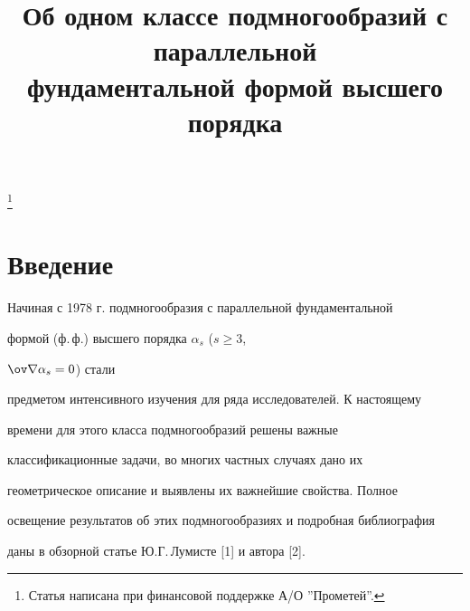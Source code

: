 

\title{Об одном классе подмногообразий с параллельной\\


фундаментальной формой высшего порядка}





\thanks{Статья написана при финансовой поддержке А/О ''Прометей''.}


\date{}







\pagestyle{plain} %













\maketitle


\label{begin}





\section{Введение}





Начиная с 1978 г. подмногообразия с параллельной фундаментальной


формой (ф.\,ф.) высшего порядка $\alpha_s$ ($s\ge 3$,


$\ov\nabla\alpha_s=0$) стали


предметом интенсивного изучения для ряда исследователей. К настоящему


времени для этого класса подмногообразий решены важные


классификационные задачи, во многих частных случаях дано их


геометрическое описание и выявлены их важнейшие свойства. Полное


освещение результатов об этих подмногообразиях и подробная библиография


даны в обзорной статье Ю.Г.\,Лумисте [1] и автора [2].





